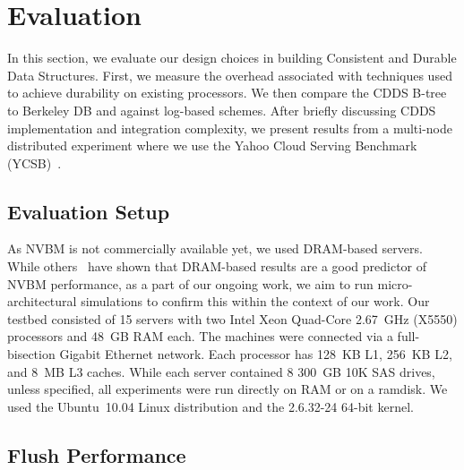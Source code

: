 \chapter{Evaluation}
\label{sec:eval}

In this section, we evaluate our design choices in building Consistent
and Durable Data Structures.  First, we measure the overhead
associated with techniques used to achieve durability on existing
processors.  We then compare the CDDS B-tree to Berkeley DB and
against log-based schemes.  After briefly discussing CDDS
implementation and integration complexity, we present results from a
multi-node distributed experiment where we use the Yahoo Cloud Serving
Benchmark (YCSB)~\citep{Cooper10}.

\section{Evaluation Setup}


As NVBM is not commercially available yet, we used DRAM-based servers.
While others~\citep{Condit09} have shown that DRAM-based results are a good
predictor of NVBM performance, as a part of our ongoing work, we aim
to run micro-architectural simulations to confirm this within the
context of our work.  Our testbed consisted of 15 servers with two
Intel Xeon Quad-Core 2.67~GHz (X5550) processors and 48~GB RAM each.
The machines were connected via a full-bisection Gigabit Ethernet 
network.  Each processor has 128~KB L1, 256~KB L2, and 8~MB L3 caches.
While each server contained 8 300~GB 10K SAS drives, unless specified,
all experiments were run directly on RAM or on a ramdisk.  We
used the Ubuntu~10.04 Linux distribution and the 2.6.32-24 64-bit
kernel.



\section{Flush Performance}
\label{sec:flush_perf}

